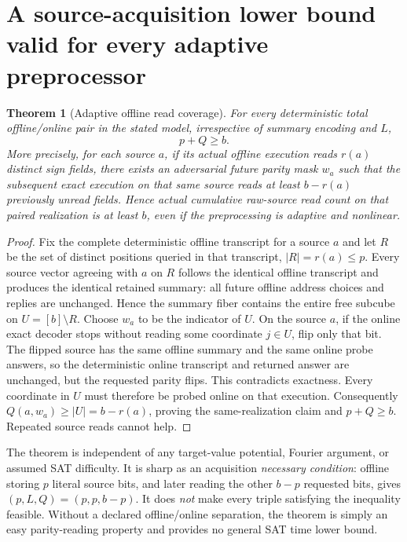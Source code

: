 \documentclass[10pt]{article}
\newtheorem{theorem}{Theorem}
\begin{document}
\section{A source-acquisition lower bound valid for every adaptive preprocessor}
\begin{theorem}[Adaptive offline read coverage]\label{th:adaptive}
For every deterministic total offline/online pair in the stated model, irrespective of summary encoding and $L$,
\[
 \boxed{p+Q\ge b.}
\]
More precisely, for \emph{each} source $a$, if its actual offline execution reads $r(a)$ distinct sign fields, there exists an adversarial future parity mask $w_a$ such that the subsequent exact execution on that \emph{same} source reads at least $b-r(a)$ previously unread fields. Hence actual cumulative raw-source read count on that paired realization is at least $b$, even if the preprocessing is adaptive and nonlinear.
\end{theorem}
\begin{proof}
Fix the complete deterministic offline transcript for a source $a$ and let $R$ be the set of distinct positions queried in that transcript, $|R|=r(a)\le p$. Every source vector agreeing with $a$ on $R$ follows the identical offline transcript and produces the identical retained summary: all future offline address choices and replies are unchanged. Hence the summary fiber contains the entire free subcube on $U=[b]\setminus R$. Choose $w_a$ to be the indicator of $U$. On the source $a$, if the online exact decoder stops without reading some coordinate $j\in U$, flip only that bit. The flipped source has the same offline summary and the same online probe answers, so the deterministic online transcript and returned answer are unchanged, but the requested parity flips. This contradicts exactness. Every coordinate in $U$ must therefore be probed online on that execution. Consequently $Q(a,w_a)\ge |U|=b-r(a)$, proving the same-realization claim and $p+Q\ge b$. Repeated source reads cannot help.\end{proof}
The theorem is independent of any target-value potential, Fourier argument, or assumed SAT difficulty. It is sharp as an acquisition \emph{necessary condition}: offline storing $p$ literal source bits, and later reading the other $b-p$ requested bits, gives $(p,L,Q)=(p,p,b-p)$. It does \emph{not} make every triple satisfying the inequality feasible. Without a declared offline/online separation, the theorem is simply an easy parity-reading property and provides no general SAT time lower bound.
\end{document}
